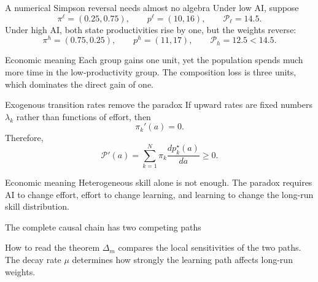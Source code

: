\documentclass[aspectratio=169,11pt]{beamer}
\newcommand{\calP}{\mathcal{P}}
\newcommand{\econmeaning}[1]{%
  \begin{block}{Economic meaning}
  #1
  \end{block}}
\begin{document}
\begin{frame}{A numerical Simpson reversal needs almost no algebra}
Under low AI, suppose
\[
\pi^\ell=(0.25,0.75),
\qquad
p^\ell=(10,16),
\qquad
\calP_\ell=14.5.
\]
Under high AI, both state productivities rise by one, but the weights reverse:
\[
\pi^h=(0.75,0.25),
\qquad
p^h=(11,17),
\qquad
\boxed{\calP_h=12.5<14.5.}
\]
\econmeaning{Each group gains one unit, yet the population spends much more time in the low-productivity group. The composition loss is three units, which dominates the direct gain of one.}
\end{frame}

\begin{frame}{Exogenous transition rates remove the paradox}
If upward rates are fixed numbers $\lambda_k$ rather than functions of effort, then
\[
\pi_k'(a)=0.
\]
Therefore,
\[
\boxed{
\calP'(a)=\sum_{k=1}^{N}\pi_k
\frac{d p_k^\star(a)}{da}\ge0.}
\]
\econmeaning{Heterogeneous skill alone is not enough. The paradox requires AI to change effort, effort to change learning, and learning to change the long-run skill distribution.}
\end{frame}

\begin{frame}{The complete causal chain has two competing paths}
\centering
{}
\vspace{5mm}
\begin{block}{How to read the theorem}
$\Delta_m$ compares the local sensitivities of the two paths. The decay rate $\mu$ determines how strongly the learning path affects long-run weights.
\end{block}
\end{frame}
\end{document}
